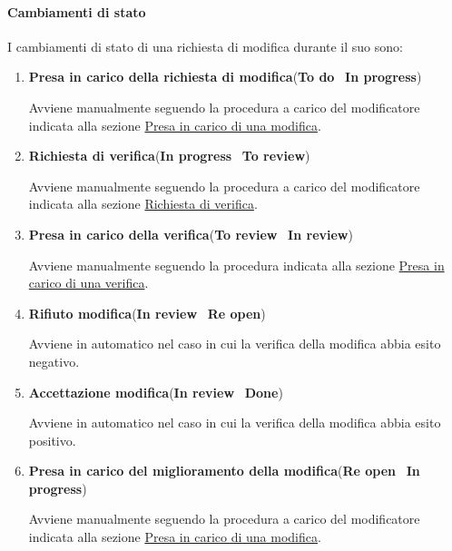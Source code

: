 \paragraph{Cambiamenti di stato}
I cambiamenti di stato di una richiesta di modifica durante il suo  sono:
\begin{enumerate}
    \item \textbf{Presa in carico della richiesta di modifica}(\textbf{To do} \textrightarrow\ \textbf{In progress})
    
    Avviene manualmente seguendo la procedura a carico del modificatore indicata alla sezione \hyperref[subpar:presa_carico_modifica]{Presa in carico di una modifica}.
    
    \item \textbf{Richiesta di verifica}(\textbf{In progress} \textrightarrow\ \textbf{To review})
    
    Avviene manualmente seguendo la procedura a carico del modificatore indicata alla sezione \hyperref[subpar:github_richiesta_di_verifica]{Richiesta di verifica}.
    
    \item \textbf{Presa in carico della verifica}(\textbf{To review} \textrightarrow\ \textbf{In review})
    
    Avviene manualmente seguendo la procedura indicata alla sezione \hyperref[subpar:presa_carico_verifica]{Presa in carico di una verifica}.
    
    \item  \textbf{Rifiuto modifica}(\textbf{In review} \textrightarrow\ \textbf{Re open})
    
    Avviene in automatico nel caso in cui la verifica della modifica abbia esito negativo.
    
    \item \textbf{Accettazione modifica}(\textbf{In review} \textrightarrow\ \textbf{Done})
    
    Avviene in automatico nel caso in cui la verifica della modifica abbia esito positivo.
    
    \item \textbf{Presa in carico del miglioramento della modifica}(\textbf{Re open} \textrightarrow\ \textbf{In progress})
    
    Avviene manualmente seguendo la procedura a carico del modificatore indicata alla sezione \hyperref[subpar:presa_carico_modifica]{Presa in carico di una modifica}.
\end{enumerate}

